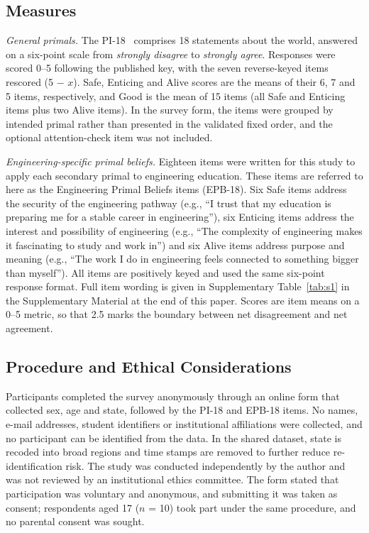 \documentclass[journal,a4paper]{IEEEtran}
\begin{document}
\subsection{Measures}

\textit{General primals.} The PI-18~\cite{cliftonyaden2021} comprises 18 statements about the world, answered on a six-point scale from \emph{strongly disagree} to \emph{strongly agree}. Responses were scored 0–5 following the published key, with the seven reverse-keyed items rescored (5 $-$ $x$). Safe, Enticing and Alive scores are the means of their 6, 7 and 5 items, respectively, and Good is the mean of 15 items (all Safe and Enticing items plus two Alive items). In the survey form, the items were grouped by intended primal rather than presented in the validated fixed order, and the optional attention-check item was not included.

\textit{Engineering-specific primal beliefs.} Eighteen items were written for this study to apply each secondary primal to engineering education. These items are referred to here as the Engineering Primal Beliefs items (EPB-18). Six Safe items address the security of the engineering pathway (e.g., ``I trust that my education is preparing me for a stable career in engineering''), six Enticing items address the interest and possibility of engineering (e.g., ``The complexity of engineering makes it fascinating to study and work in'') and six Alive items address purpose and meaning (e.g., ``The work I do in engineering feels connected to something bigger than myself''). All items are positively keyed and used the same six-point response format. Full item wording is given in Supplementary Table~\ref{tab:s1} in the Supplementary Material at the end of this paper. Scores are item means on a 0–5 metric, so that 2.5 marks the boundary between net disagreement and net agreement.

\subsection{Procedure and Ethical Considerations}

Participants completed the survey anonymously through an online form that collected sex, age and state, followed by the PI-18 and EPB-18 items. No names, e-mail addresses, student identifiers or institutional affiliations were collected, and no participant can be identified from the data. In the shared dataset, state is recoded into broad regions and time stamps are removed to further reduce re-identification risk. The study was conducted independently by the author and was not reviewed by an institutional ethics committee. The form stated that participation was voluntary and anonymous, and submitting it was taken as consent; respondents aged 17 ($n$ = 10) took part under the same procedure, and no parental consent was sought.
\end{document}
